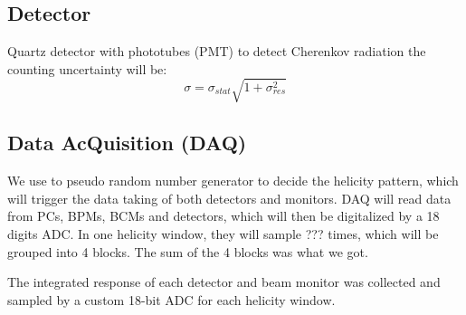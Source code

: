 \subsection{Detector}
Quartz detector with phototubes (PMT) to detect Cherenkov radiation
the counting uncertainty will be:
\begin{equation}
    \sigma = \sigma_{stat}\sqrt{1 + \sigma^2_{res}}
\end{equation}

\subsection{Data AcQuisition (DAQ)}
We use to pseudo random number generator to decide the helicity pattern, which
will trigger the data taking of both detectors and monitors. DAQ will read data
from PCs, BPMs, BCMs and detectors, which will then be digitalized by a 18 digits
ADC. In one helicity window, they will sample ??? times, which will be grouped
into 4 blocks. The sum of the 4 blocks was what we got.

The integrated response of each detector and beam monitor was collected and sampled 
by a custom 18-bit ADC for each helicity window.

